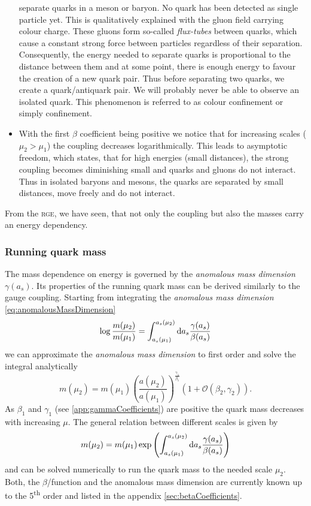 \documentclass[../../index.tex]{subfiles}
\begin{document}
\begin{itemize}
  separate quarks in a meson or baryon. No quark has been detected as single
  particle yet. This is qualitatively explained with the gluon field carrying
  colour charge. These gluons form so-called \textit{flux-tubes} between quarks,
  which cause a constant strong force between particles regardless of their
  separation. Consequently, the energy needed to separate quarks is proportional
  to the distance between them and at some point, there is enough energy to
  favour the creation of a new quark pair. Thus before separating two quarks, we
  create a quark\-/antiquark pair. We will probably never be able to observe an
  isolated quark. This phenomenon is referred to as colour confinement or simply
  confinement.
\item With the first \(\beta\) coefficient being positive we notice that for
  increasing scales (\(\mu_2>\mu_1\)) the coupling decreases logarithmically.
  This leads to asymptotic freedom, which states, that for high energies (small
  distances), the strong coupling becomes diminishing small and quarks and
  gluons do not interact. Thus in isolated baryons and mesons, the quarks are
  separated by small distances, move freely and do not interact. \end{itemize}

From the \textsc{rge}, we have seen, that not only the coupling but also the
masses carry an energy dependency.

\subsubsection{Running quark mass}
The mass dependence on energy is governed by the \textit{anomalous mass
  dimension} \(\gamma(a_s)\). Its properties of the running quark mass can be
derived similarly to the gauge coupling. Starting from integrating the
\textit{anomalous mass dimension} \cref{eq:anomalousMassDimension}
\begin{equation}
  \log \frac{m(\mu_2)}{m(\mu_1)} = \int_{a_s(\mu_1)}^{a_s(\mu_2)} \dif a_s \frac{\gamma(a_s)}{\beta(a_s)}
\end{equation}
we can approximate the \textit{anomalous mass dimension} to first order and
solve the integral analytically \cite{Schwab2002}
\begin{equation}
  m(\mu_2) = m(\mu_1)\left( \frac{a(\mu_2)}{a(\mu_1)} \right)^{\frac{\gamma_1}{\beta_1}} \left( 1 + \mathcal{O}(\beta_2, \gamma_2) \right).
\end{equation}
As \(\beta_1\) and \(\gamma_1\) (see \ref{app:gammaCoefficients}) are positive
the quark mass decreases with increasing \(\mu\). The general relation between
different scales is given by
\begin{equation}
  m(\mu_2) = m(\mu_1) \exp \left( \int_{a_s(\mu_1)}^{a_s(\mu_2)} \dif a_s \frac{\gamma(a_s)}{\beta(a_s)}  \right)
\end{equation}
and can be solved numerically to run the quark mass to the needed scale
\(\mu_2\). Both, the \(\beta\)\-/function and the anomalous mass dimension are
currently known up to the 5\textsuperscript{th} order and listed in the appendix
\ref{sec:betaCoefficients}.
\end{document}
